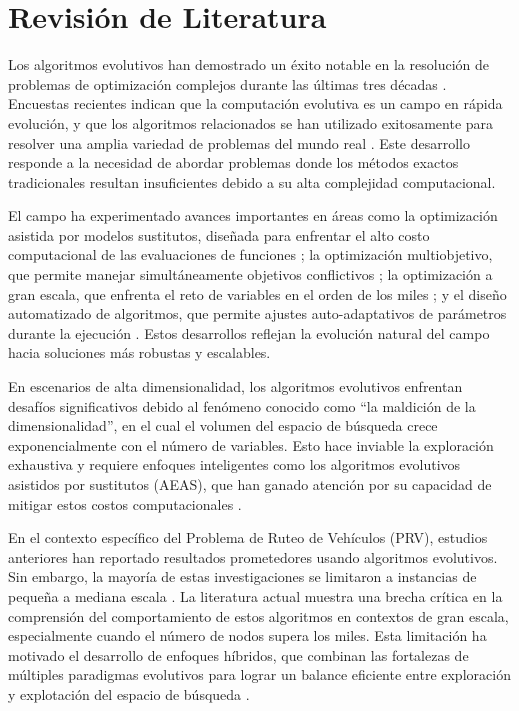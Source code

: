 \documentclass[10pt,a4paper]{article}
\begin{document}
\section{Revisión de Literatura}

Los algoritmos evolutivos han demostrado un éxito notable en la resolución de problemas de optimización complejos durante las últimas tres décadas \cite{fogel2006,back2013}. Encuestas recientes indican que la computación evolutiva es un campo en rápida evolución, y que los algoritmos relacionados se han utilizado exitosamente para resolver una amplia variedad de problemas del mundo real \cite{yang2013}. Este desarrollo responde a la necesidad de abordar problemas donde los métodos exactos tradicionales resultan insuficientes debido a su alta complejidad computacional.

El campo ha experimentado avances importantes en áreas como la optimización asistida por modelos sustitutos, diseñada para enfrentar el alto costo computacional de las evaluaciones de funciones \cite{jin2011}; la optimización multiobjetivo, que permite manejar simultáneamente objetivos conflictivos \cite{coello2007,zhang2008}; la optimización a gran escala, que enfrenta el reto de variables en el orden de los miles \cite{lozano2011}; y el diseño automatizado de algoritmos, que permite ajustes auto-adaptativos de parámetros durante la ejecución \cite{brest2006}. Estos desarrollos reflejan la evolución natural del campo hacia soluciones más robustas y escalables.

En escenarios de alta dimensionalidad, los algoritmos evolutivos enfrentan desafíos significativos debido al fenómeno conocido como ``la maldición de la dimensionalidad'', en el cual el volumen del espacio de búsqueda crece exponencialmente con el número de variables. Esto hace inviable la exploración exhaustiva y requiere enfoques inteligentes como los algoritmos evolutivos asistidos por sustitutos (AEAS), que han ganado atención por su capacidad de mitigar estos costos computacionales \cite{wang2018}.

En el contexto específico del Problema de Ruteo de Vehículos (PRV), estudios anteriores han reportado resultados prometedores usando algoritmos evolutivos. Sin embargo, la mayoría de estas investigaciones se limitaron a instancias de pequeña a mediana escala \cite{rego2011}. La literatura actual muestra una brecha crítica en la comprensión del comportamiento de estos algoritmos en contextos de gran escala, especialmente cuando el número de nodos supera los miles. Esta limitación ha motivado el desarrollo de enfoques híbridos, que combinan las fortalezas de múltiples paradigmas evolutivos para lograr un balance eficiente entre exploración y explotación del espacio de búsqueda \cite{potter2000}.
\end{document}
